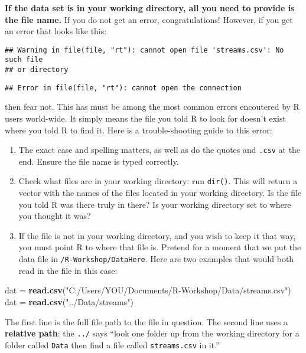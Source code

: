 \documentclass[]{book}
\newenvironment{Shaded}{\begin{snugshade}}{\end{snugshade}}
\newcommand{\KeywordTok}[1]{\textcolor[rgb]{0.13,0.29,0.53}{\textbf{#1}}}
\newcommand{\StringTok}[1]{\textcolor[rgb]{0.31,0.60,0.02}{#1}}
\newcommand{\NormalTok}[1]{#1}
\theoremstyle{definition}
\theoremstyle{definition}
\theoremstyle{definition}
\theoremstyle{remark}
\begin{document}
\textbf{If the data set is in your working directory, all you need to
provide is the file name.} If you do not get an error, congratulations!
However, if you get an error that looks like this:

\begin{verbatim}
## Warning in file(file, "rt"): cannot open file 'streams.csv': No such file
## or directory
\end{verbatim}

\begin{verbatim}
## Error in file(file, "rt"): cannot open the connection
\end{verbatim}

then fear not. This has must be among the most common errors encoutered
by R users world-wide. It simply means the file you told R to look for
doesn't exist where you told R to find it. Here is a trouble-shooting
guide to this error:

\begin{enumerate}
\def\labelenumi{\arabic{enumi}.}
\item
  The exact case and spelling matters, as well as do the quotes and
  \texttt{.csv} at the end. Ensure the file name is typed correctly.
\item
  Check what files are in your working directory: run \texttt{dir()}.
  This will return a vector with the names of the files located in your
  working directory. Is the file you told R was there truly in there? Is
  your working directory set to where you thought it was?
\item
  If the file is not in your working directory, and you wish to keep it
  that way, you must point R to where that file is. Pretend for a moment
  that we put the data file in \texttt{/R-Workshop/DataHere}. Here are
  two examples that would both read in the file in this case:
\end{enumerate}

\begin{Shaded}
\begin{Highlighting}[]
\NormalTok{dat =}\StringTok{ }\KeywordTok{read.csv}\NormalTok{(}\StringTok{"C:/Users/YOU/Documents/R-Workshop/Data/streams.csv"}\NormalTok{)}
\NormalTok{dat =}\StringTok{ }\KeywordTok{read.csv}\NormalTok{(}\StringTok{"../Data/streams"}\NormalTok{)}
\end{Highlighting}
\end{Shaded}

The first line is the full file path to the file in question. The second
line uses a \textbf{relative path}: the \texttt{../} says ``look one
folder up from the working directory for a folder called \texttt{Data}
then find a file called \texttt{streams.csv} in it.''
\end{document}
